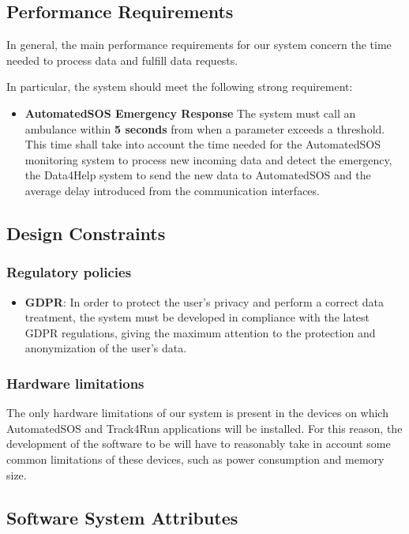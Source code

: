 \FloatBarrier

\FloatBarrier

\subsection{Performance Requirements}
In general, the main performance requirements for our system concern the time needed to process data and fulfill data requests.

In particular, the system should meet the following strong requirement:

\begin{itemize}
	\item \textbf{AutomatedSOS Emergency Response}
	The system must call an ambulance within \textbf{5 seconds} from when a parameter exceeds a threshold. This time shall take into account the time needed for the AutomatedSOS monitoring system to process new incoming data and detect the emergency, the Data4Help system to send the new data to AutomatedSOS and the average delay introduced from the communication interfaces.
\end{itemize}

\subsection{Design Constraints}
\subsubsection{Regulatory policies}
\begin{itemize}
	\item \textbf{GDPR}: In order to protect the user's privacy and perform a correct data treatment, the system must be developed in compliance with the latest GDPR regulations, giving the maximum attention to the protection and anonymization of the user's data.
\end{itemize}
\subsubsection{Hardware limitations}
The only hardware limitations of our system is present in the devices on which AutomatedSOS and Track4Run applications will be installed. For this reason, the development of the software to be will have to reasonably take in account some common limitations of these devices, such as power consumption and memory size.


\subsection{Software System Attributes}

